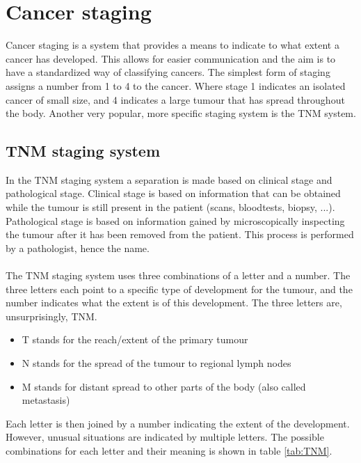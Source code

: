 \chapter{Cancer staging}
\label{app:cancer-staging}
Cancer staging is a system that provides a means to indicate to what extent a cancer has developed. This allows for easier communication and the aim is to have a standardized way of classifying cancers. The simplest form of staging assigns a number from 1 to 4 to the cancer. Where stage 1 indicates an isolated cancer of small size, and 4 indicates a large tumour that has spread throughout the body. Another very popular, more specific staging system is the TNM system.

\section{TNM staging system}
In the TNM staging system a separation is made based on clinical stage and pathological stage. Clinical stage is based on information that can be obtained while the tumour is still present in the patient (scans, bloodtests, biopsy, ...). Pathological stage is based on information gained by microscopically inspecting the tumour after it has been removed from the patient. This process is performed by a pathologist, hence the name. \\ \\
The TNM staging system uses three combinations of a letter and a number. The three letters each point to a specific type of development for the tumour, and the number indicates what the extent is of this development. The three letters are, unsurprisingly, TNM.
\begin{itemize}
	\item T stands for the reach/extent of the primary tumour
	\item N stands for the spread of the tumour to regional lymph nodes
	\item M stands for distant spread to other parts of the body (also called metastasis)
\end{itemize}
Each letter is then joined by a number indicating the extent of the development. However, unusual situations are indicated by multiple letters. The possible combinations for each letter and their meaning is shown in table \ref{tab:TNM}.
